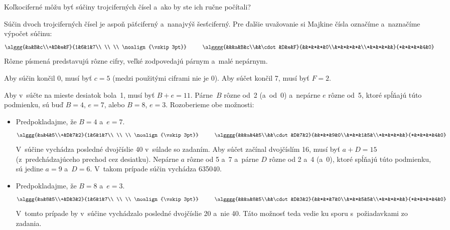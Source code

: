 {%
\napad
Koľkociferné môžu byť súčiny trojciferných čísel a~ako by ste ich ručne počítali?

\riesenie
Súčin dvoch trojciferných čísel je aspoň päťciferný a~nanajvýš šesťciferný.
Pre ďalšie uvažovanie si Majkine čísla označíme a~naznačíme výpočet súčinu:
$$
\alggg{&a&B&c\\+&D&e&F}{1&6&1&7\\ \\ \\ \noalign{\vskip3pt}}
\hskip1cm
\algggg{&&&a&B&c\\&&\cdot&D&e&F}{&&*&*&*&0\\&*&*&*&*&\\*&*&*&*&&}{*&*&*&*&4&0}
$$
Rôzne písmená predstavujú rôzne cifry, veľké zodpovedajú párnym a~malé nepárnym.

Aby súčin končil 0, musí byť $c=5$ (medzi použitými ciframi nie je 0).
Aby súčet končil 7, musí byť $F=2$.

Aby v~súčte na mieste desiatok bola~1, musí byť $B+e=11$.
Párne~$B$ rôzne od~2 (a~od~0) a~nepárne $e$ rôzne od~5, ktoré spĺňajú túto podmienku, sú buď $B=4$, $e=7$, alebo $B=8$, $e=3$.
Rozoberieme obe možnosti:
\begin{itemize}
\item Predpokladajme, že $B=4$ a~$e=7$.
$$
\alggg{&a&4&5\\+&D&7&2}{1&6&1&7\\ \\ \\ \noalign{\vskip3pt}}
\hskip1cm
\algggg{&&&a&4&5\\&&\cdot&D&7&2}{&&*&*&9&0\\&*&*&1&5&\\*&*&*&*&&}{*&*&*&*&4&0}
$$
V~súčine vychádza posledné dvojčíslie 40 v~súlade so zadaním.
Aby súčet začínal dvojčíslím 16, musí byť $a+D=15$ (z~predchádzajúceho prechod cez desiatku).
Nepárne $a$ rôzne od 5 a~7 a~párne $D$ rôzne od 2 a~4 (a~0), ktoré spĺňajú túto podmienku, sú jedine $a=9$ a~$D=6$.
V~takom prípade súčin vychádza 635040.
\item Predpokladajme, že $B=8$ a~$e=3$.
$$
\alggg{&a&8&5\\+&D&3&2}{1&6&1&7\\ \\ \\ \noalign{\vskip3pt}}
\hskip1cm
\algggg{&&&a&8&5\\&&\cdot&D&3&2}{&&*&*&7&0\\&*&*&5&5&\\*&*&*&*&&}{*&*&*&*&4&0}
$$
V~tomto prípade by v~súčine vychádzalo posledné dvojčíslie 20 a~nie 40.
Táto možnosť teda vedie ku sporu s~požiadavkami zo zadania.
\end{itemize}

}
